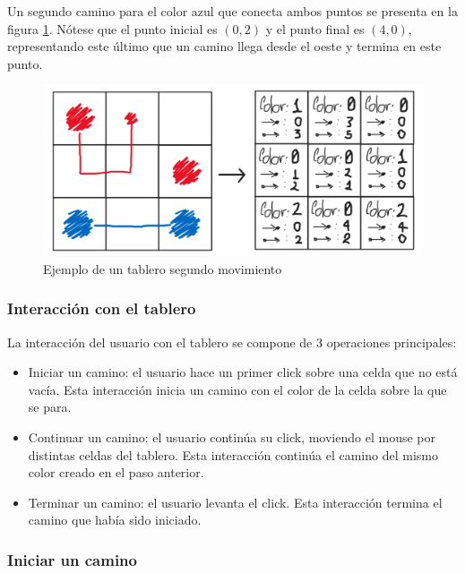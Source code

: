\documentclass[letter,12pt]{article}
\begin{document}
Un segundo camino para el color azul que conecta ambos puntos se presenta en la figura \ref{fig:ejemplo_tablero_mov2}. Nótese que el punto inicial es $(0,2)$ y el punto final es $(4,0)$, representando este último que un camino llega desde el oeste y termina en este punto. \par

\begin{figure}[ht!]
	\centering
	\includegraphics[scale=0.35]{img/example_grid_mov2.png}
	\caption{Ejemplo de un tablero segundo movimiento}
	\label{fig:ejemplo_tablero_mov2}
\end{figure}

\subsubsection{Interacción con el tablero} \label{diseño:logica:interaccion}

La interacción del usuario con el tablero se compone de 3 operaciones principales: \par

\begin{itemize}
    \item Iniciar un camino: el usuario hace un primer click sobre una celda que no está vacía. Esta interacción inicia un camino con el color de la celda sobre la que se para.
    \item Continuar un camino: el usuario continúa su click, moviendo el mouse por distintas celdas del tablero. Esta interacción continúa el camino del mismo color creado en el paso anterior.
    \item Terminar un camino: el usuario levanta el click. Esta interacción termina el camino que había sido iniciado.
\end{itemize}

\subsubsection{Iniciar un camino} \label{diseño:logica:iniciar}
\end{document}
